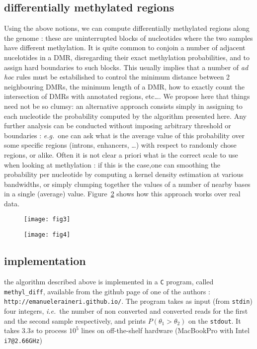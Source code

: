 \documentclass[11pt]{amsart}
\newcommand{\ie}{\textit{i.e.}\ }
\newcommand{\eg}{\textit{e.g.}\ }
\begin{document}
\subsection{differentially methylated regions}
Using the above notions, we can compute differentially methylated regions along the genome : these are uninterrupted blocks of nucleotides where the two samples have different methylation.
It is quite common to conjoin a number of adjacent nucelotides in a DMR, disregarding their exact methylation probabilities, and to assign hard boundaries to such blocks. This usually implies that a number of \textit{ad hoc} rules must be estabilished to control the minimum distance between 2 neighbouring DMRs, the minimum length of a DMR, how to exactly count the intersection of DMRs with annotated regions, etc\dots. We propose here that things need not be so clumsy: an alternative approach consists simply in assigning to each nucleotide the probability computed by the algorithm presented here. Any further analysis can be conducted without imposing arbitrary threshold or boundaries : \eg one can ask what is the average value of this probability over some specific regions (introns, enhancers, \dots) with respect to randomly chose regions, or alike. Often it is not clear a priori what is the correct scale to use when looking at methylation : if this is the case,one can smoothing the probability per nucleotide by computing a kernel density estimation at various bandwidths, or simply clumping together the values of a number of nearby bases in a single (average) value. Figure~\ref{dmr} shows how this approach works over real data.
\begin{figure}[h]
\caption{}
\texttt{[image: fig3]}
\label{pvalues}
\end{figure}
\begin{figure}[h]
\caption{}
\texttt{[image: fig4]}
\label{dmr}
\end{figure}

\subsection{implementation}
the algorithm described above is implemented in a \verb=C= program, called \verb=methyl_diff=, available from the github page of one of the authors : \verb=http://emanueleraineri.github.io/=. The program takes as input (from \verb=stdin=) four integers, \ie the number of non converted and converted reads for the first and the second sample respectively, and prints $P(\theta_1>\theta_2)$ on the \verb=stdout=. It takes $3.3s$ to process $10^5$ lines on off-the-shelf hardware (MacBookPro with Intel \verb=i7@2.66GHz=) 


\end{document}
